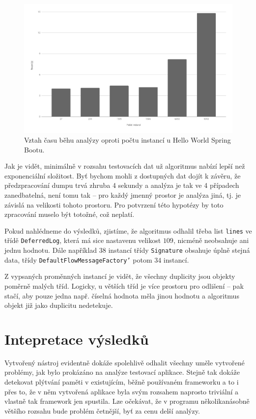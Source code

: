 \begin{figure}[ht!]
	\centering
	\includegraphics[scale=0.38]{obrazky/runtime-boot.png}
	\caption{Vztah času běhu analýzy oproti počtu instancí u Hello World Spring Bootu.}
	\label{obr-runtime-spring}
\end{figure}

Jak je vidět, minimálně v rozsahu testovacích dat už algoritmus nabízí lepší než exponenciální složitost. Byť bychom mohli z dostupných dat dojít k závěru, že  předzpracování dumpu trvá zhruba 4 sekundy a analýza je tak ve 4 případech zanedbatelná, není tomu tak -- pro každý jmenný prostor je analýza jiná, tj. je závislá na velikosti tohoto prostoru. Pro potvrzení této hypotézy by toto zpracování muselo být totožné, což neplatí.


Pokud nahlédneme do výsledků, zjistíme, že algoritmus odhalil třeba list \texttt{lines} ve třídě \texttt{DeferredLog}, která má sice nastavenu velikost $109$, nicméně neobsahuje ani jednu hodnotu. Dále například $38$ instancí třídy \texttt{Signature} obsahuje úplně stejná data, třídy \texttt{Default\-Flow\-Message\-Factory'} potom $34$ instancí.

Z vypsaných proměnných instancí je vidět, že všechny duplicity jsou objekty poměrně malých tříd. Logicky, u větších tříd je více prostoru pro odlišení -- pak stačí, aby pouze jedna např. číselná hodnota měla jinou hodnotu a algoritmus objekt již jako duplicitu nedetekuje.

\section{Intepretace výsledků}
Vytvořený nástroj evidentně dokáže spolehlivě odhalit všechny uměle vytvořené problémy, jak bylo prokázáno na analýze testovací aplikace. Stejně tak dokáže detekovat plýtvání paměti v existujícím, běžně používaném frameworku a to i přes to, že v něm vytvořená aplikace byla svým rozsahem naprosto triviální a vlastně tak framework jen spustila. Lze očekávat, že v programu několikanásobně většího rozsahu bude problém četnější, byť za cenu delší analýzy.

